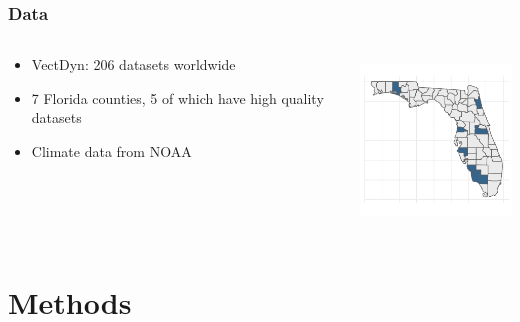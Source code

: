 \documentclass{beamer}
\begin{document}
\begin{frame}{}
\frametitle{Data}
\begin{columns}
	\begin{column}{0.5\textwidth}
		\begin{itemize}
			\item VectDyn: 206 datasets worldwide
			\item 7 Florida counties, 5 of which have high quality datasets
			\item Climate data from NOAA
		\end{itemize}
	\vspace{1cm}
	\end{column}
	\begin{column}{0.5\textwidth}  %
		\begin{center}
			\includegraphics[height = 4.5cm, width=.9\textwidth]{floridamap.pdf}
		\end{center}
	\vspace{1cm}
	\end{column}
\end{columns}
	
\end{frame}

\section{Methods}
\end{document}
